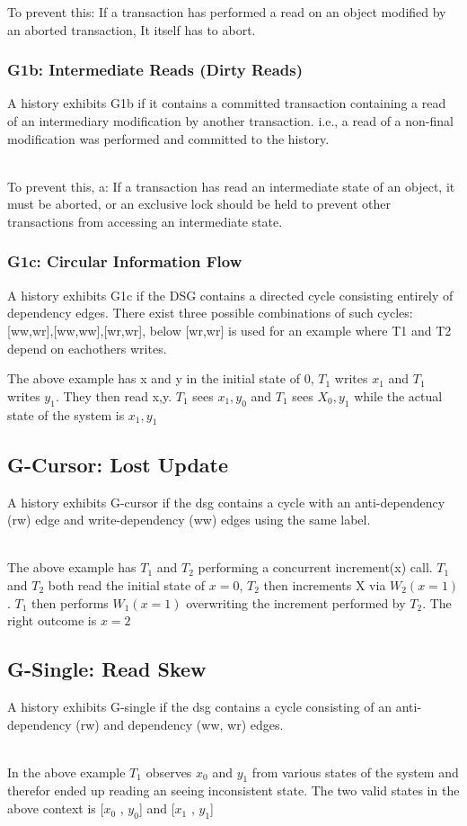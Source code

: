 \documentclass[a4paper,10pt,titlepage]{report}
\begin{document}
To prevent this: If a transaction has performed a read on an object modified by an aborted transaction, It itself has to abort.
\subsubsection{G1b: Intermediate Reads (Dirty Reads)}
    A history exhibits G1b if it contains a committed transaction containing a read of an intermediary modification by another transaction. i.e., a read of a non-final modification was performed and committed to the history. 

 \\
To prevent this, a: If a transaction has read an intermediate state of an object, it must be aborted, or an exclusive lock should be held to prevent other transactions from accessing an intermediate state.


\subsubsection{G1c: Circular Information Flow}
A history exhibits G1c if the DSG contains a directed cycle consisting entirely of dependency edges. There exist three possible combinations of such cycles: [ww,wr],[ww,ww],[wr,wr], below [wr,wr] is used for an example where T1 and T2 depend on eachothers writes.


The above example has x and y in the initial state of 0, $T_1$ writes $x_1$ and $T_1$ writes $y_1$. They then read x,y. $T_1$ sees $x_1,y_0$ and $T_1$ sees $X_0,y_1$ while the actual state of the system is $x_1,y_1$


\subsection{G-Cursor: Lost Update}
A history exhibits G-cursor if the dsg contains a cycle with an anti-dependency (rw) edge and write-dependency (ww) edges using the same label.

\\
The above example has $T_1$ and $T_2$ performing a concurrent increment(x) call. $T_1$ and $T_2$ both read the initial state of $x=0$, $T_2$ then increments X via $W_2(x=1)$. $T_1$ then performs $W_1(x=1)$ overwriting the increment performed by $T_2$. The right outcome is $x = 2$

\subsection{G-Single: Read Skew}
A history exhibits G-single if the dsg contains a cycle consisting of an anti-dependency (rw) and dependency (ww, wr) edges.

\\
In the above example $T_1$ observes $x_0$ and $y_1$ from various states of the system and therefor ended up reading an seeing inconsistent state. The two valid states in the above context is [$x_0$ , $y_0$] and [$x_1$ , $y_1$]
\end{document}
